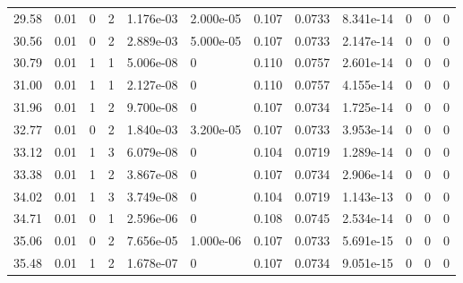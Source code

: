 \documentclass[preview]{standalone}
\begin{document}
{{{\begin{tabular}{L{1.2cm}C{1.2cm} C{0.3cm}C{0.5cm} C{1.4cm}C{1.4cm} C{1.4cm}C{1.4cm} C{1.6cm}C{1.6cm} C{1.6cm}C{1.6cm}}
  29.58  &  0.01  & 0     &  2 &  1.176e-03  & 2.000e-05  &  0.107&   0.0733& 8.341e-14 & 0   &  0 & 0  \\ 
  30.56  &  0.01  & 0     &  2 &  2.889e-03  & 5.000e-05  &  0.107&   0.0733& 2.147e-14 & 0   &  0 & 0  \\ 
  30.79  &  0.01  & 1     &  1 &  5.006e-08  & 0  &  0.110&   0.0757& 2.601e-14 & 0   &  0 & 0  \\ 
  31.00  &  0.01  & 1     &  1 &  2.127e-08  & 0  &  0.110&   0.0757& 4.155e-14 & 0   &  0 & 0  \\ 
  31.96  &  0.01  & 1     &  2 &  9.700e-08  & 0  &  0.107&   0.0734& 1.725e-14 & 0   &  0 & 0  \\ 
  32.77  &  0.01  & 0     &  2 &  1.840e-03  & 3.200e-05  &  0.107&   0.0733& 3.953e-14 & 0   &  0 & 0  \\ 
  33.12  &  0.01  & 1     &  3 &  6.079e-08  & 0  &  0.104&   0.0719& 1.289e-14 & 0   &  0 & 0  \\ 
  33.38  &  0.01  & 1     &  2 &  3.867e-08  & 0  &  0.107&   0.0734& 2.906e-14 & 0   &  0 & 0  \\ 
  34.02  &  0.01  & 1     &  3 &  3.749e-08  & 0  &  0.104&   0.0719& 1.143e-13 & 0   &  0 & 0  \\ 
  34.71  &  0.01  & 0     &  1 &  2.596e-06  & 0  &  0.108&   0.0745& 2.534e-14 & 0   &  0 & 0  \\ 
  35.06  &  0.01  & 0     &  2 &  7.656e-05  & 1.000e-06  &  0.107&   0.0733& 5.691e-15 & 0   &  0 & 0  \\ 
  35.48  &  0.01  & 1     &  2 &  1.678e-07  & 0  &  0.107&   0.0734& 9.051e-15 & 0   &  0 & 0  \\ 
\hline 
\end{tabular} 

}}}
\end{document}
